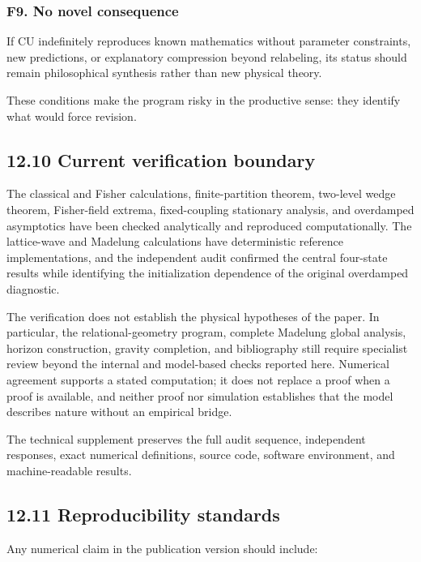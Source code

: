 \documentclass[
  11pt,
]{article}
\begin{document}
\subsubsection{F9. No novel consequence}\label{f9.-no-novel-consequence}

If CU indefinitely reproduces known mathematics without parameter
constraints, new predictions, or explanatory compression beyond
relabeling, its status should remain philosophical synthesis rather than
new physical theory.

These conditions make the program risky in the productive sense: they
identify what would force revision.

\subsection{12.10 Current verification
boundary}\label{current-verification-boundary}

The classical and Fisher calculations, finite-partition theorem,
two-level wedge theorem, Fisher-field extrema, fixed-coupling stationary
analysis, and overdamped asymptotics have been checked analytically and
reproduced computationally. The lattice-wave and Madelung calculations
have deterministic reference implementations, and the independent audit
confirmed the central four-state results while identifying the
initialization dependence of the original overdamped diagnostic.

The verification does not establish the physical hypotheses of the
paper. In particular, the relational-geometry program, complete Madelung
global analysis, horizon construction, gravity completion, and
bibliography still require specialist review beyond the internal and
model-based checks reported here. Numerical agreement supports a stated
computation; it does not replace a proof when a proof is available, and
neither proof nor simulation establishes that the model describes nature
without an empirical bridge.

The technical supplement preserves the full audit sequence, independent
responses, exact numerical definitions, source code, software
environment, and machine-readable results.

\subsection{12.11 Reproducibility
standards}\label{reproducibility-standards}

Any numerical claim in the publication version should include:
\end{document}
